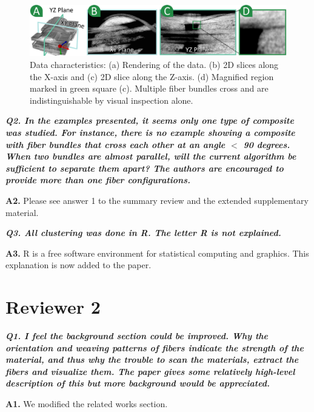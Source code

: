 \documentclass[]{article}
\begin{document}
\begin{figure}[tb]
	\centering
	\includegraphics[width=\linewidth]{images_pvis/data-char.pdf}
	\caption{Data characteristics: (a) Rendering of the data. (b) 2D slices along the X-axis and (c) 2D slice along the Z-axis. (d) Magnified region marked in green square (c). Multiple fiber bundles cross and are indistinguishable by visual inspection alone. }
	\label{fig:data-char-rebuttal}
\end{figure}


\textbf{\textit{
Q2. In the examples presented, it seems only one type of composite was studied. For instance, there is no example showing a composite with fiber bundles that cross each other at an angle $<$ 90 degrees. When two bundles are almost parallel, will the current algorithm be sufficient to separate them apart? The authors are encouraged to provide more than one fiber configurations.
}}


\textbf{A2.} Please see answer 1 to the summary review and the extended supplementary material.  

\makebox[\linewidth]{\rule{0.25\textwidth}{0.4pt}}


\textbf{\textit{
Q3. All clustering was done in R. The letter R is not explained.
}}


\textbf{A3.} R is a free software environment for statistical computing and graphics. This explanation is now added to the paper.


\section*{Reviewer 2}

\textbf{\textit{
Q1. I feel the background section could be improved. Why the orientation and weaving patterns of fibers indicate the strength of the material, and thus why the trouble to scan the materials, extract the fibers and visualize them. The paper gives some relatively high-level description of this but more background would be appreciated.
}}



\textbf{A1.} We modified the related works section.

\makebox[\linewidth]{\rule{0.25\textwidth}{0.4pt}}
\end{document}
